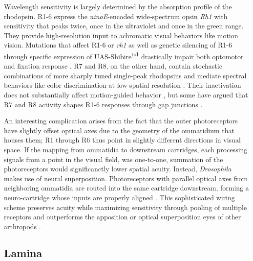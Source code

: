Wavelength sensitivity is largely determined by the absorption profile of the rhodopsin. R1-6 express the \textit{ninaE}-encoded wide-spectrum opsin \textit{Rh1} with sensitivity that peaks twice, once in the ultraviolet and once in the green range. They provide high-resolution input to achromatic visual behaviors like motion vision. Mutations that affect R1-6 or \textit{rh1} as well as genetic silencing of R1-6 through specific expression of UAS-Shibire\textsuperscript{ts1} drastically impair both optomotor and fixation response \citep{Heisenberg:1977aa,OTousa:1985aa,Rister:2007fn}. R7 and R8, on the other hand, contain stochastic combinations of more sharply tuned single-peak rhodopsins \citep{Franceschini:1981aa} and mediate spectral behaviors like color discrimination at low spatial resolution \citep{Schnaitmann:2013aa}. Their inactivation does not substantially affect motion-guided behavior \citep{Yamaguchi:2008aa}, but some have argued that R7 and R8 activity shapes R1-6 responses through gap junctions \citep{Wardill:2012aa}.

An interesting complication arises from the fact that the outer photoreceptors have slightly offset optical axes due to the geometry of the ommatidium that houses them; R1 through R6 thus point in slightly different directions in visual space. If the mapping from ommatidia to downstream cartridges, each processing signals from a point in the visual field, was one-to-one, summation of the photoreceptors would significanctly lower spatial acuity. Instead, \textit{Drosophila} makes use of neural superposition. Photoreceptors with parallel optical axes from neighboring ommatidia are routed into the same cartridge downstream, forming a neuro-cartridge whose inputs are properly aligned \citep{Trujillo:1966aa,Braitenberg:1967aa}. This sophisticated wiring scheme preserves acuity while maximizing sensitivity through pooling of multiple receptors and outperforms the apposition or optical superposition eyes of other arthropods \citep{Kirschfeld:1967aa}.

\subsection{Lamina}

